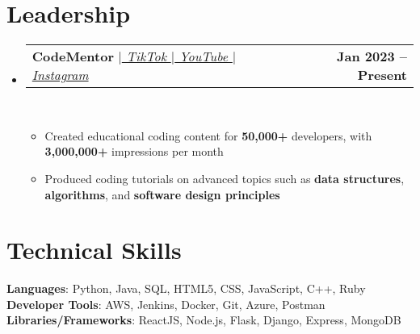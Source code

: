 \documentclass[letterpaper,11pt]{article}
\makeatletter
\newcommand{\resumeItem}[1]{
  \item\small{
    {#1 \vspace{0pt}}
  }
}
\newcommand{\resumeProjectHeading}[2]{
    \item
    \begin{tabular*}{1.001\textwidth}{l@{\extracolsep{\fill}}r}
      \small#1 & \textbf{\small #2}\\
    \end{tabular*}\vspace{-7pt}
}
\newcommand{\resumeSubHeadingListStart}{\begin{itemize}[leftmargin=0.0in, label={}]}
\newcommand{\resumeSubHeadingListEnd}{\end{itemize}}\vspace{0pt}
\newcommand{\resumeItemListStart}{\begin{itemize}}
\newcommand{\resumeItemListEnd}{\end{itemize}\vspace{-5pt}}
\makeatother
\begin{document}
\section{Leadership} 
    \vspace{-5pt}
    \resumeSubHeadingListStart
                   \resumeProjectHeading
            {\textbf{{CodeMentor}} $|$\emph{{\href{https://www.tiktok.com/@codementor?lang=en}{ TikTok $|$}\href{https://www.youtube.com/channel/UCgKFOz_KrMbmypWrawtzDQg}{ YouTube $|$}\href{https://www.instagram.com/codementor/}{ Instagram}}}}{Jan 2023 -- Present}
            \\[5mm]
          \resumeItemListStart
            \resumeItem{Created educational coding content for \textbf{50,000+} developers, with \textbf{3,000,000+} impressions per month}
            \resumeItem{Produced coding tutorials on advanced topics such as \textbf{data structures}, \textbf{algorithms}, and \textbf{software design principles}}
          \resumeItemListEnd
          \resumeSubHeadingListEnd
 \vspace{-12pt}
\section{Technical Skills}
 \begin{itemize}[leftmargin=0.15in, label={}]
    \small{\item{   
     \textbf{Languages}{: Python, Java, SQL, HTML5, CSS, JavaScript, C++, Ruby} \\[1mm]
     \textbf{Developer Tools}{: AWS, Jenkins, Docker, Git, Azure, Postman} \\[1mm]
     \textbf{Libraries/Frameworks}{: ReactJS, Node.js, Flask, Django, Express, MongoDB} \\ [1mm]
    }}
 \end{itemize}
 \vspace{-16pt}
 \vspace{3pt}
\vspace{10pt}

\vspace{-15pt}
\end{document}
